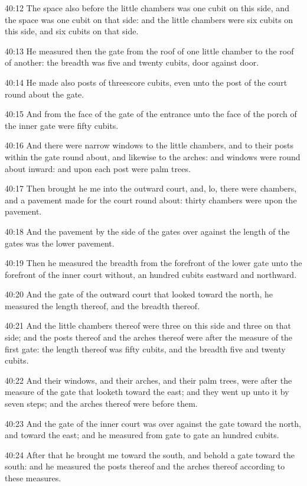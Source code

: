 40:12 The space also before the little chambers was one cubit on this side, and the space was one cubit on that side: and the little chambers were six cubits on this side, and six cubits on that side.

40:13 He measured then the gate from the roof of one little chamber to the roof of another: the breadth was five and twenty cubits, door against door.

40:14 He made also posts of threescore cubits, even unto the post of the court round about the gate.

40:15 And from the face of the gate of the entrance unto the face of the porch of the inner gate were fifty cubits.

40:16 And there were narrow windows to the little chambers, and to their posts within the gate round about, and likewise to the arches: and windows were round about inward: and upon each post were palm trees.

40:17 Then brought he me into the outward court, and, lo, there were chambers, and a pavement made for the court round about: thirty chambers were upon the pavement.

40:18 And the pavement by the side of the gates over against the length of the gates was the lower pavement.

40:19 Then he measured the breadth from the forefront of the lower gate unto the forefront of the inner court without, an hundred cubits eastward and northward.

40:20 And the gate of the outward court that looked toward the north, he measured the length thereof, and the breadth thereof.

40:21 And the little chambers thereof were three on this side and three on that side; and the posts thereof and the arches thereof were after the measure of the first gate: the length thereof was fifty cubits, and the breadth five and twenty cubits.

40:22 And their windows, and their arches, and their palm trees, were after the measure of the gate that looketh toward the east; and they went up unto it by seven steps; and the arches thereof were before them.

40:23 And the gate of the inner court was over against the gate toward the north, and toward the east; and he measured from gate to gate an hundred cubits.

40:24 After that he brought me toward the south, and behold a gate toward the south: and he measured the posts thereof and the arches thereof according to these measures.

